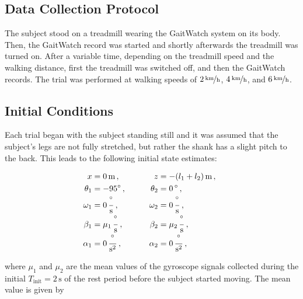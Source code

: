 \subsection{Data Collection Protocol}

The subject stood on a treadmill wearing the GaitWatch system on its body. Then, the GaitWatch record was started and shortly afterwards the treadmill was turned on. After a variable time, depending on the treadmill speed and the walking distance, first the treadmill was switched off, and then the GaitWatch records. The trial was performed at walking speeds of $\unitfrac[2]{km}{h}$, $\unitfrac[4]{km}{h}$, and $\unitfrac[6]{km}{h}$.

\subsection{Initial Conditions}\label{sec:initial_cond}

Each trial began with the subject standing still and it was assumed that the subject's legs are not fully stretched, but rather the shank has a slight pitch to the back. This leads to the following initial state estimates:

\begin{equation}
\begin{matrix}
	\begin{split}
	  x &= 0\,\mbox{m}\,, \\
	  \theta_1 &= -95^{\circ}\,, \\
	  \omega_1 &= 0\,\frac{^{\circ}}{\mbox{s}}\,, \\
	  \beta_1 &= \mu_1\,\frac{^{\circ}}{\mbox{s}}\,, \\
	  \alpha_1 &= 0\,\frac{^{\circ}}{\mbox{s}^2}\,, 
\end{split} \qquad \quad
    \begin{split}
   	  z &= -(l_1+l_2)\,\mbox{m}\,, \\
	  \theta_2 &= 0\,^{\circ}\,, \mathrel{\phantom{90^{\circ}}}\\
	  \omega_2 &= 0\,\frac{^{\circ}}{\mbox{s}}\,, \\
	  \beta_2 &= \mu_2\,\frac{^{\circ}}{\mbox{s}}\,, \\
	  \alpha_2 &= 0\,\frac{^{\circ}}{\mbox{s}^2}\,,  
\end{split}
\end{matrix} \\
\end{equation}

\noindent
where $\mu_1$ and $\mu_2$ are the mean values of the gyroscope signals collected during the initial $T_{\text{init}} = 2\,\mbox{s}$ of the rest period before the subject started moving. The mean value is given by

